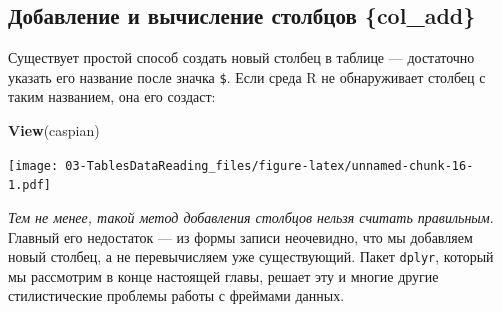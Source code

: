 \documentclass[]{book}
\newenvironment{Shaded}{\begin{snugshade}}{\end{snugshade}}
\newcommand{\KeywordTok}[1]{\textcolor[rgb]{0.13,0.29,0.53}{\textbf{#1}}}
\newcommand{\DecValTok}[1]{\textcolor[rgb]{0.00,0.00,0.81}{#1}}
\newcommand{\StringTok}[1]{\textcolor[rgb]{0.31,0.60,0.02}{#1}}
\newcommand{\OtherTok}[1]{\textcolor[rgb]{0.56,0.35,0.01}{#1}}
\newcommand{\OperatorTok}[1]{\textcolor[rgb]{0.81,0.36,0.00}{\textbf{#1}}}
\newcommand{\NormalTok}[1]{#1}
\begin{document}
\begin{Shaded}
\end{Shaded}

\subsection{Добавление и вычисление столбцов
\{col\_add\}}\label{----col_add}

Существует простой способ создать новый столбец в таблице --- достаточно
указать его название после значка \texttt{\$}. Если среда R не
обнаруживает столбец с таким названием, она его создаст:

\begin{Shaded}
\end{Shaded}

\begin{Shaded}
\begin{Highlighting}[]
\KeywordTok{View}\NormalTok{(caspian)}
\end{Highlighting}
\end{Shaded}

\texttt{[image: 03-TablesDataReading\_files/figure-latex/unnamed-chunk-16-1.pdf]}

\emph{Тем не менее, такой метод добавления столбцов нельзя считать
правильным}. Главный его недостаток --- из формы записи неочевидно, что
мы добавляем новый столбец, а не перевычисляем уже существующий. Пакет
\texttt{dplyr}, который мы рассмотрим в конце настоящей главы, решает
эту и многие другие стилистические проблемы работы с фреймами данных.
\end{document}
